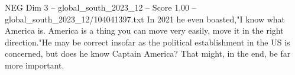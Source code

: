 \begin{textsample}{NEG Dim 3 – global\_south\_2023\_12 – Score 1.00 – global\_south\_2023\_12/104041397.txt}
In 2021 he even boasted,"I know what America is.
America is a thing you can move very easily, move it in the right direction."He may be correct insofar as the political establishment in the US is concerned, but does he know Captain America?
That might, in the end, be far more important.

\end{textsample}

